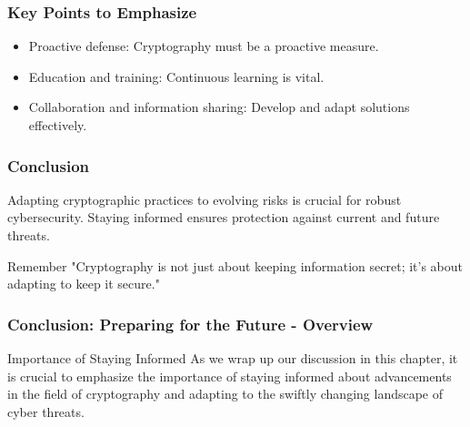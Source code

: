 \documentclass{beamer}
\begin{document}
\begin{frame}[fragile]
    \frametitle{Key Points to Emphasize}
    \begin{itemize}
        \item Proactive defense: Cryptography must be a proactive measure.
        \item Education and training: Continuous learning is vital.
        \item Collaboration and information sharing: Develop and adapt solutions effectively.
    \end{itemize}
\end{frame}

\begin{frame}[fragile]
    \frametitle{Conclusion}
    Adapting cryptographic practices to evolving risks is crucial for robust cybersecurity. Staying informed ensures protection against current and future threats.
    
    \begin{block}{Remember}
        "Cryptography is not just about keeping information secret; it's about adapting to keep it secure."
    \end{block}
\end{frame}

\begin{frame}[fragile]
    \frametitle{Conclusion: Preparing for the Future - Overview}
    \begin{block}{Importance of Staying Informed}
        As we wrap up our discussion in this chapter, it is crucial to emphasize the importance of staying informed about advancements in the field of cryptography and adapting to the swiftly changing landscape of cyber threats.
    \end{block}
\end{frame}
\end{document}

